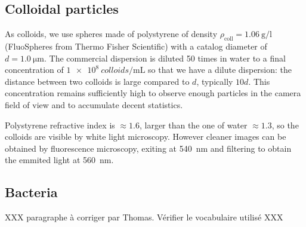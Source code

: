 \documentclass[%
 aip,
 jmp,%
 amsmath,amssymb,
reprint,%
]{revtex4-1}
\begin{document}
\subsection{Colloidal particles}

As colloids, we use spheres made of polystyrene of density $\rho_\text{coll} = \SI{1.06}{\gram\per\litre}$ (FluoSpheres\circledR{} from Thermo Fisher Scientific) with a catalog diameter of $d = \SI{1.0}{\micro\meter}$. The commercial dispersion is diluted 50 times in water to a final concentration of $\SI{1e8}{colloids\per\milli\liter}$ so that we have a dilute dispersion: the distance between two colloids is large compared to $d$, typically $10 d$. This concentration remains sufficiently high to observe enough particles in the camera field of view and to accumulate decent statistics.

Polystyrene refractive index is $\approx 1.6$, larger than the one of water $\approx 1.3$, so the colloids are visible by white light microscopy. However cleaner images can be obtained by fluorescence microscopy, exiting at \SI{540}{\nano\metre} and filtering to obtain the emmited light at \SI{560}{\nano\metre}.


\subsection{Bacteria}

XXX paragraphe à corriger par Thomas. Vérifier le vocabulaire utilisé XXX
\end{document}

